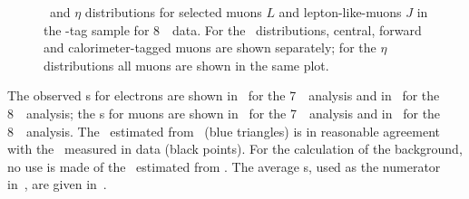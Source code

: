 \begin{figure}[h]
{        }
    \caption[\pt\ and $\eta$ distributions for selected muons $L$ and
    lepton-like-muons $J$ in the \Z-tag sample for 8~\tev\ data.]
    {\small \pt\ and $\eta$ distributions for selected muons $L$ and
    lepton-like-muons $J$ in the \Z-tag sample for 8~\tev\ data. 
    For the \pt\ distributions, central, forward and calorimeter-tagged muons are shown
    separately; for the $\eta$ distributions all muons are
    shown in the same plot.}
\label{fig:ljdist-mu-eight} 
\end{figure}


The observed \fakefactor s for electrons are shown in~ for the
7~\tev\ analysis and in~ for the 8~\tev\ analysis; the \fakefactor s
for muons are shown in~ for the
7~\tev\ analysis and in~ for the 8~\tev\ analysis. The
\ffactor\ estimated from \mc\ (blue triangles) is in reasonable agreement with
the \ffactor\ measured in data (black points). For the calculation of the
background, no use is made of the \ffactor\ estimated from \mc. The average \FF
s, used as the numerator in~, are given in~.

